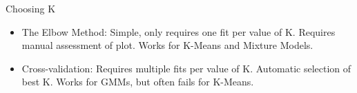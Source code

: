 \documentclass[serif,xcolor=pdftex,dvipsnames,table,hyperref={bookmarks=false,breaklinks}]{beamer}
\begin{document}
\begin{frame}[t]{Choosing K}

\begin{itemize}
\item The Elbow Method: Simple, only requires one fit per value of K. Requires manual assessment of plot. Works for K-Means and Mixture Models.

\pause\item Cross-validation: Requires multiple fits per value of K. Automatic selection of best K. 
Works for GMMs, but often fails for K-Means.
\end{itemize}
\end{frame}
\end{document}
